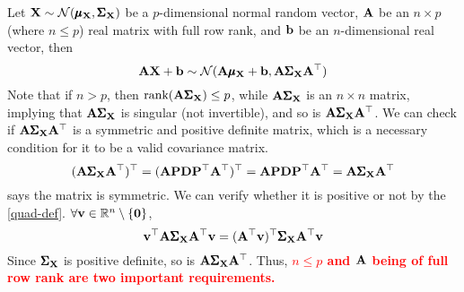      \begin{Thm}\label{normal-vector-trans}
         Let $\mathbf{X}\sim\mathcal{N}(\pmb{\mu}_{\mathbf{X}}, \pmb{\Sigma}_{\mathbf{X}})$ be a $p$-dimensional normal random vector, $\mathbf{A}$ be an  $n\times p$ (where $n\leq p$) real matrix with full row rank, and $\mathbf{b}$ be an $n$-dimensional real vector, then
         \begin{equation}
             \mathbf{A}\mathbf{X} + \mathbf{b} \sim \mathcal{N}(\mathbf{A}\pmb{\mu}_{\mathbf{X}}+\mathbf{b}, \mathbf{A}\pmb{\Sigma}_{\mathbf{X}}\mathbf{A}^{\top})
         \end{equation}
         Note that if $n > p$, then  $\text{rank}(\mathbf{A}\pmb{\Sigma}_{\mathbf{X}})\leq p$, while $\mathbf{A}\pmb{\Sigma}_{\mathbf{X}}$ is an $n\times n$ matrix, implying that $\mathbf{A}\pmb{\Sigma}_{\mathbf{X}}$ is singular (not invertible), and so is $\mathbf{A}\pmb{\Sigma}_{\mathbf{X}}\mathbf{A}^{\top}$. We can check if $\mathbf{A}\pmb{\Sigma}_{\mathbf{X}}\mathbf{A}^{\top}$ is a symmetric and positive definite matrix, which is a necessary condition for it to be a valid covariance matrix.
        \begin{equation}
            (\mathbf{A}\pmb{\Sigma}_{\mathbf{X}}\mathbf{A}^{\top})^{\top} = (\mathbf{APD}\mathbf{P}^{\top}\mathbf{A}^{\top})^{\top} = \mathbf{APD}\mathbf{P}^{\top}\mathbf{A}^{\top} = \mathbf{A}\pmb{\Sigma}_{\mathbf{X}}\mathbf{A}^{\top}
        \end{equation}
        says the matrix is symmetric. We can verify whether it is positive or not by the \cref{quad-def}. $\forall \mathbf{v}\in \mathbb{R}^n \setminus \{\mathbf{0}\}$, 
         \begin{equation}
             \mathbf{v}^{\top}\mathbf{A}\pmb{\Sigma}_{\mathbf{X}}\mathbf{A}^{\top}\mathbf{v} = (\mathbf{A}^{\top}\mathbf{v})^{\top}\pmb{\Sigma}_{\mathbf{X}} \mathbf{A}^{\top}\mathbf{v}
         \end{equation}
         Since $\pmb{\Sigma}_{\mathbf{X}}$ is positive definite, so is $\mathbf{A}\pmb{\Sigma}_{\mathbf{X}}\mathbf{A}^{\top}$. Thus, \textbf{\textcolor{red}{$n \leq p$ and $\mathbf{A}$ being of full row rank are two important requirements.}}
     \end{Thm}


